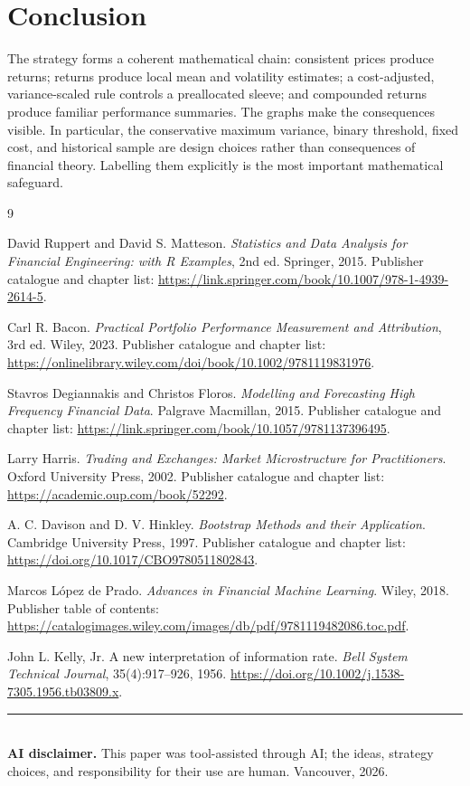\documentclass[11pt]{article}
\begin{document}
\section*{Conclusion}

The strategy forms a coherent mathematical chain: consistent prices produce returns; returns
produce local mean and volatility estimates; a cost-adjusted, variance-scaled rule controls a
preallocated sleeve; and compounded returns produce familiar performance summaries. The graphs
make the consequences visible. In particular, the conservative maximum variance, binary
threshold, fixed cost, and historical sample are design choices rather than consequences of
financial theory. Labelling them explicitly is the most important mathematical safeguard.

\begin{thebibliography}{9}

David Ruppert and David S. Matteson.
\newblock \emph{Statistics and Data Analysis for Financial Engineering: with R Examples}, 2nd ed.
\newblock Springer, 2015.
\newblock Publisher catalogue and chapter list:
\url{https://link.springer.com/book/10.1007/978-1-4939-2614-5}.

Carl R. Bacon.
\newblock \emph{Practical Portfolio Performance Measurement and Attribution}, 3rd ed.
\newblock Wiley, 2023.
\newblock Publisher catalogue and chapter list:
\url{https://onlinelibrary.wiley.com/doi/book/10.1002/9781119831976}.

Stavros Degiannakis and Christos Floros.
\newblock \emph{Modelling and Forecasting High Frequency Financial Data}.
\newblock Palgrave Macmillan, 2015.
\newblock Publisher catalogue and chapter list:
\url{https://link.springer.com/book/10.1057/9781137396495}.

Larry Harris.
\newblock \emph{Trading and Exchanges: Market Microstructure for Practitioners}.
\newblock Oxford University Press, 2002.
\newblock Publisher catalogue and chapter list:
\url{https://academic.oup.com/book/52292}.

A. C. Davison and D. V. Hinkley.
\newblock \emph{Bootstrap Methods and their Application}.
\newblock Cambridge University Press, 1997.
\newblock Publisher catalogue and chapter list:
\url{https://doi.org/10.1017/CBO9780511802843}.

Marcos L\'opez de Prado.
\newblock \emph{Advances in Financial Machine Learning}.
\newblock Wiley, 2018.
\newblock Publisher table of contents:
\url{https://catalogimages.wiley.com/images/db/pdf/9781119482086.toc.pdf}.

John L. Kelly, Jr.
\newblock A new interpretation of information rate.
\newblock \emph{Bell System Technical Journal}, 35(4):917--926, 1956.
\newblock \url{https://doi.org/10.1002/j.1538-7305.1956.tb03809.x}.

\end{thebibliography}

\vfill
\begin{center}
\footnotesize\color{slate}
\rule{0.78\textwidth}{0.4pt}\\[0.6em]
\textbf{AI disclaimer.} This paper was tool-assisted through AI; the ideas, strategy choices,
and responsibility for their use are human. Vancouver, 2026.
\end{center}
\end{document}
